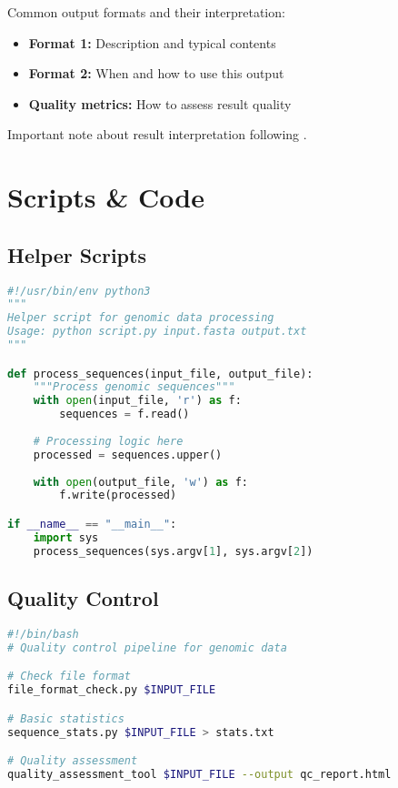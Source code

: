 \documentclass[a4paper,11pt]{article}
\begin{document}
Common output formats and their interpretation:
\begin{itemize}
    \item \textbf{Format 1:} Description and typical contents
    \item \textbf{Format 2:} When and how to use this output
    \item \textbf{Quality metrics:} How to assess result quality
\end{itemize}

\begin{remark}
Important note about result interpretation following \citet{author2024}.
\end{remark}

\section{Scripts \& Code}

\subsection{Helper Scripts}
\begin{lstlisting}[language=Python, caption=Data processing script]
#!/usr/bin/env python3
"""
Helper script for genomic data processing
Usage: python script.py input.fasta output.txt
"""

def process_sequences(input_file, output_file):
    """Process genomic sequences"""
    with open(input_file, 'r') as f:
        sequences = f.read()
    
    # Processing logic here
    processed = sequences.upper()
    
    with open(output_file, 'w') as f:
        f.write(processed)

if __name__ == "__main__":
    import sys
    process_sequences(sys.argv[1], sys.argv[2])
\end{lstlisting}

\subsection{Quality Control}
\begin{lstlisting}[language=bash, caption=QC pipeline]
#!/bin/bash
# Quality control pipeline for genomic data

# Check file format
file_format_check.py $INPUT_FILE

# Basic statistics
sequence_stats.py $INPUT_FILE > stats.txt

# Quality assessment
quality_assessment_tool $INPUT_FILE --output qc_report.html
\end{lstlisting}
\end{document}
